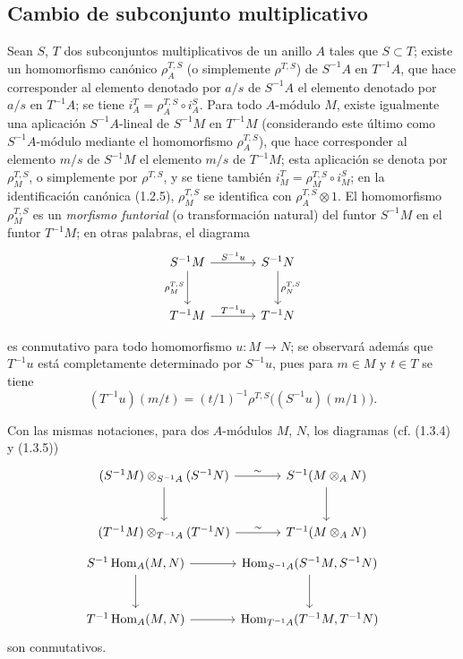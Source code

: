 \subsection{Cambio de subconjunto multiplicativo}
\label{subsection:0.1.4-fr}

\begin{env}[1.4.1]
\label{0.1.4.1-fr}
Sean $S$, $T$ dos subconjuntos multiplicativos de un anillo $A$ tales que $S\subset T$; existe un homomorfismo canónico $\rho_A^{T,S}$ (o simplemente $\rho^{T,S}$) de $S^{-1}A$ en $T^{-1}A$, que hace corresponder al elemento denotado por $a/s$ de $S^{-1}A$ el elemento denotado por $a/s$ en $T^{-1}A$; se tiene
$i_A^T=\rho_A^{T,S}\circ i_A^S$.
Para todo $A$-módulo $M$, existe igualmente una aplicación $S^{-1}A$-lineal de $S^{-1}M$ en $T^{-1}M$ (considerando este último como $S^{-1}A$-módulo mediante el homomorfismo $\rho_A^{T,S}$), que hace corresponder al elemento $m/s$ de $S^{-1}M$ el elemento $m/s$ de $T^{-1}M$; esta aplicación se denota por $\rho_M^{T,S}$, o simplemente por $\rho^{T,S}$, y se tiene también
$i_M^T=\rho_M^{T,S}\circ i_M^S$;
en la identificación canónica (1.2.5), $\rho_M^{T,S}$ se identifica con $\rho_A^{T,S}\otimes 1$.
El homomorfismo $\rho_M^{T,S}$ es un \emph{morfismo funtorial} (o transformación natural) del funtor $S^{-1}M$ en el funtor $T^{-1}M$; en otras palabras, el diagrama
\[
\begin{tikzcd}[column sep=large,row sep=large]
S^{-1}M \arrow[r,"S^{-1}u"] \arrow[d,"\rho_M^{T,S}"'] & S^{-1}N \arrow[d,"\rho_N^{T,S}"] \\
T^{-1}M \arrow[r,"T^{-1}u"] & T^{-1}N
\end{tikzcd}
\]

es conmutativo para todo homomorfismo $u:M\to N$; se observará además que $T^{-1}u$ está completamente determinado por $S^{-1}u$, pues para $m\in M$ y $t\in T$ se tiene
\[
  (T^{-1}u)(m/t)=(t/1)^{-1}\rho^{T,S}\bigl((S^{-1}u)(m/1)\bigr).
\]
\end{env}

\begin{env}[1.4.2]
\label{0.1.4.2-fr}
Con las mismas notaciones, para dos $A$-módulos $M$, $N$, los diagramas (cf. (1.3.4) y (1.3.5))
\[
\begin{tikzcd}[column sep=large,row sep=large]
(S^{-1}M)\otimes_{S^{-1}A}(S^{-1}N) \arrow[r,"\sim"] \arrow[d]
  & S^{-1}(M\otimes_A N) \arrow[d]
  \\
(T^{-1}M)\otimes_{T^{-1}A}(T^{-1}N) \arrow[r,"\sim"]
  & T^{-1}(M\otimes_A N)
\end{tikzcd}
\]
\[
\begin{tikzcd}[column sep=large,row sep=large]
S^{-1}\operatorname{Hom}_A(M,N) \arrow[r] \arrow[d]
  & \operatorname{Hom}_{S^{-1}A}(S^{-1}M,S^{-1}N) \arrow[d] \\
T^{-1}\operatorname{Hom}_A(M,N) \arrow[r]
  & \operatorname{Hom}_{T^{-1}A}(T^{-1}M,T^{-1}N)
\end{tikzcd}
\]
son conmutativos.
\end{env}

